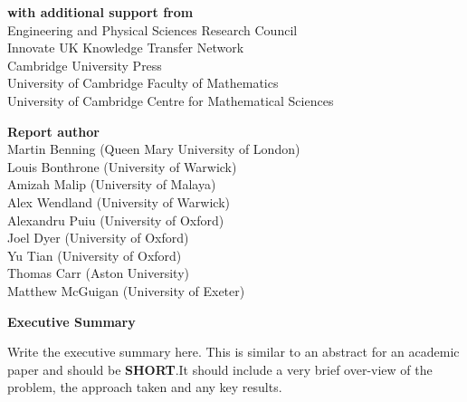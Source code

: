\documentclass[12pt]{article}
\begin{document}
\begin{center}
\textbf{with additional support from}\\
Engineering and Physical Sciences Research Council\\
Innovate UK Knowledge Transfer Network\\
Cambridge University Press\\
University of Cambridge Faculty of Mathematics\\
University of Cambridge Centre for Mathematical Sciences
\end{center}
\newpage
\begin{center}
    \large\textbf{Report author}\\ %
   \vskip1cm
    \normalsize Martin Benning (Queen Mary University of London) \\
    \normalsize Louis Bonthrone (University of Warwick)\\
    \normalsize Amizah Malip (University of Malaya)\\
    \normalsize Alex Wendland (University of Warwick)\\
    \normalsize Alexandru Puiu (University of Oxford)\\
    \normalsize Joel Dyer (University of Oxford)\\
    \normalsize Yu Tian (University of Oxford)\\
    \normalsize Thomas Carr (Aston University)\\
    \normalsize Matthew McGuigan (University of Exeter)
\end{center}
\vskip2cm
\begin{center}
    \textbf{Executive Summary}
\end{center}
Write the executive summary here. This is similar to an abstract for an academic paper and should be \textbf{SHORT}.It should include a very brief over-view of the problem, the approach taken and any key results.
\newpage
\end{document}
